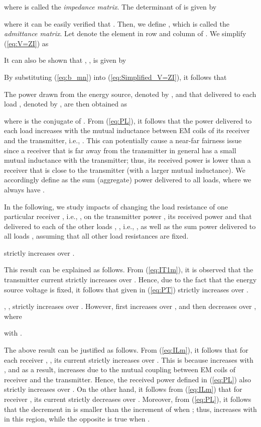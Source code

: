 \documentclass[onecolumn, a4size, 11pt]{IEEEtran}
\begin{document}
where  is called the  \textit{impedance matrix}.    The determinant of
    is  given by

where it can be easily verified that . 
Then, we define , which  is called  the  \textit{admittance matrix}. Let  denote the element in  row   and  column  of  .   We   simplify (\ref{eq:V=ZI}) as   

It  can also be shown that 
, , is given by

By substituting (\ref{eq:b_mn}) into (\ref{eq:Simplified_V=ZI}), it  follows that

The power drawn from the energy source, denoted by , and that delivered to each load ,  denoted by , are then obtained  as

where  is the conjugate of . From (\ref{eq:PL}), it follows that the power delivered to each load    increases with the mutual inductance between EM coils of its receiver  and  the transmitter, i.e., . This can potentially cause a near-far fairness issue  since a receiver  that is far away from the transmitter in general has a small mutual inductance with the transmitter; thus, its received power is lower than a receiver that is close to the transmitter (with a larger mutual inductance). 
We accordingly define    as the sum (aggregate) power delivered to all loads, where we always have  .  

In the following, we study impacts of changing the load resistance of one particular receiver , i.e., ,  on  the transmitter power  , its received power  and that delivered to each of the other loads , , i.e., ,  as well as the sum power delivered to all loads ,   assuming  that all other load   resistances are   fixed. 
\begin{property} \label{Prop:3}
   strictly increases over .
\end{property}


This result  can be explained as follows.   From  (\ref{eq:IT1m}), it is  observed that the transmitter current   strictly increases over  . Hence, due to the fact that the energy source voltage    is  fixed, it follows that  given  in (\ref{eq:PT})  strictly increases over . 


\begin{property} \label{Prop:4}
,  ,  strictly increases  over  . However,    first increases  over , and then decreases over , where  

with  
.
\end{property}


The above result can be justified as follows.   From  (\ref{eq:ILm}), it follows that  for each receiver , , its current  strictly increases over  .  This is because  increases with , and as a result,  increases due to the mutual coupling between EM coils of receiver  and the transmitter.   
Hence,  the received power   defined in (\ref{eq:PL}) also strictly increases over . On the other hand, it follows from (\ref{eq:ILm}) that for receiver ,  its current   strictly decreases  over . Moreover, from (\ref{eq:PL}), it follows that the decrement in  is smaller than the increment of  when ; thus,  increases with  in this region, while the opposite is  true when .
\end{document}
